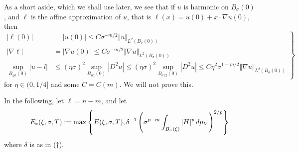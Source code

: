 As a short aside, which we shall use later, we see that if $u$ is harmonic on $B_{\sigma}(0)$, and $\ell$ is the affine approximation of $u$, that is $\ell(x)=u(0) + x\cdot \nabla u(0)$, then
\begin{equation}
    \left.\begin{aligned}
    |\ell(0)| &= |u(0)| \le C\sigma^{-m/2} \Vert u \Vert_{L^2(B_{\sigma}(0))} \\
    |\nabla\ell| &= |\nabla u(0)| \le C\sigma^{-m/2}\Vert \nabla u \Vert_{L^2(B_{\sigma}(0))} \label{eq: harmapproxaside}\\
    \sup_{B_{\eta\sigma}(0)} |u-l| &\le (\eta\sigma)^2\sup_{B_{\eta\sigma}(0)} |D^2u| \le (\eta\sigma)^2\sup_{B_{\sigma/2}(0)}|D^2u| \le C\eta^2\sigma^{1-m/2}\Vert \nabla u\Vert_{L^2(B_{\sigma}(0))}
    \end{aligned}\right\}
\end{equation}
for $\eta \in (0,1/4]$ and some $C = C(m)$. We will not prove this.


In the following, let $\ell = n - m$, and let
\[
    E_*(\xi,\sigma,T) := \max\left\{ E(\xi,\sigma,T), \delta^{-1} \left( \sigma^{p-m} \int_{B_{\sigma}(\xi)} |H|^p\, d\mu_V \right)^{2/p} \right\}
\]
where $\delta$ is as in ($\dagger$).

